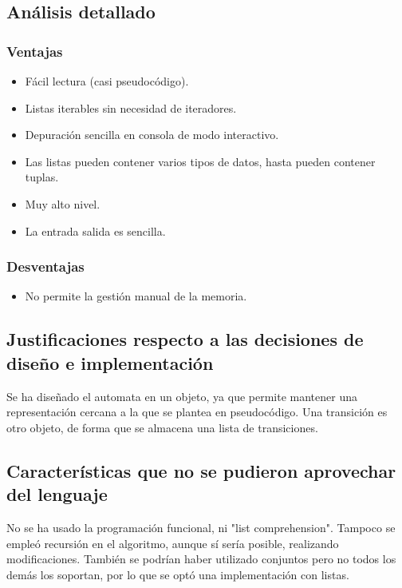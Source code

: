 \documentclass[12pt,a4paper]{article}
\begin{document}
\subsection{Análisis detallado}

\subsubsection{Ventajas}
\begin{itemize}
\item Fácil lectura (casi pseudocódigo).
\item Listas iterables sin necesidad de iteradores.
\item Depuración sencilla en consola de modo interactivo.
\item Las listas pueden contener varios tipos de datos, hasta pueden contener 
tuplas.
\item Muy alto nivel.
\item La entrada salida es sencilla.
\end{itemize}

\subsubsection{Desventajas}
\begin{itemize}
\item No permite la gestión manual de la memoria.
\end{itemize}
  

\subsection{Justificaciones respecto a las decisiones de diseño e 
implementación}
Se ha diseñado el automata en un objeto, ya que permite mantener una
representación cercana a la que se plantea en pseudocódigo. Una transición es 
otro objeto, de forma que se almacena una lista de transiciones.


\subsection{Características que no se pudieron aprovechar del lenguaje}
No se ha usado la programación funcional, ni "list comprehension". Tampoco se 
empleó recursión en el algoritmo, aunque sí sería posible, realizando 
modificaciones. También se podrían haber utilizado conjuntos pero no todos los 
demás los soportan, por lo que se optó una implementación con listas.
\end{document}
